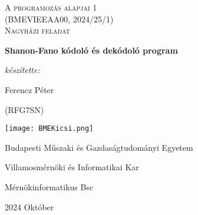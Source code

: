 \begin{titlepage}
    \centering
    \vspace{1cm}
    {\Large \textsc{A programozás alapjai 1\\(BMEVIEEAA00, 2024/25/1)\\  Nagyházi feladat}\par}
    \vspace{1.5cm}  
    {\huge\bfseries Shanon-Fano kódoló és dekódoló program\par}
    \vspace{2cm}
    {\Large\itshape készítette: \par Ferencz Péter\par (RFG7SN)}
    \vfill
    \texttt{[image: BMEKicsi.png]}\par
    Budapesti Műszaki és Gazdaságtudományi Egyetem\par
    Villamosmérnöki és Informatikai Kar\par
    Mérnökinformatikus Bsc\par
    {\large 2024 Október\par}
\end{titlepage}